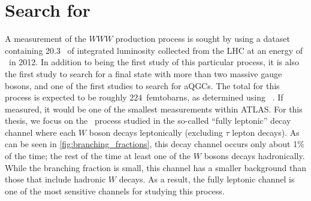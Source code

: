 \chapter{Search for \wwwlll}
\label{sec:www}





A measurement of the $WWW$ production process
is sought by using a dataset containing 20.3 \ifb~of integrated luminosity
collected from the LHC at an energy of \energy~in 2012.
In addition to being the first study of this particular process,
it is also the first study to search for a final state with more 
than two massive gauge bosons, and one of the first studies
to search for aQGCs.
The total \xsec for this process is expected
to be roughly $224$~femtobarns, as determined using 
\madgraph~\cite{MadGraph}. If measured, it 
would be one of the smallest \xsec measurements
within ATLAS. %
For this thesis, we focus on the \www~process studied in the 
so-called ``fully leptonic'' decay channel
where each $W$ boson decays leptonically (excluding $\tau$ lepton decays).
As can be seen in \fig\ref{fig:branching_fractions},
this decay channel occurs only about 1\% of the time;
the rest of the time
at least one of the $W$ bosons decays hadronically.
While the branching fraction is small,
this channel has a smaller background than those 
that include hadronic $W$ decays.
As a result, the fully leptonic channel
is one of the most sensitive channels
for studying this process.


